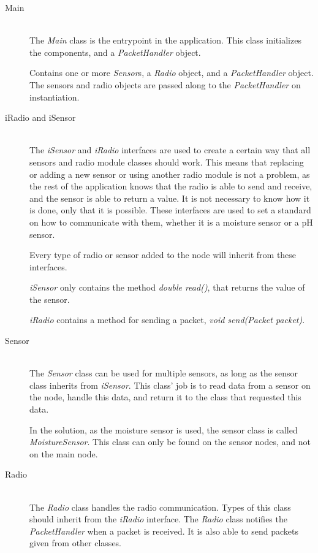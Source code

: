 \begin{description}
\item[Main] \hfill \\
The \textit{Main} class is the entrypoint in the application. This class initializes the components, and a \textit{PacketHandler} object.

Contains one or more \textit{Sensor}s, a \textit{Radio} object, and a \textit{PacketHandler} object. The sensors and radio objects are passed along to the \textit{PacketHandler} on instantiation.

\item[iRadio and iSensor] \hfill \\
The \textit{iSensor} and \textit{iRadio} interfaces are used to create a certain way that all sensors and radio module classes should work. This means that replacing or adding a new sensor or using another radio module is not a problem, as the rest of the application knows that the radio is able to send and receive, and the sensor is able to return a value. 
It is not necessary to know how it is done, only that it is possible. These interfaces are used to set a standard on how to communicate with them, whether it is a moisture sensor or a pH sensor.

Every type of radio or sensor added to the node will inherit from these interfaces.


\textit{iSensor} only contains the method \textit{double read()}, that returns the value of the sensor. 

\textit{iRadio} contains a method for sending a packet, \textit{void send(Packet packet)}. 

\item[Sensor] \hfill \\
The \textit{Sensor} class can be used for multiple sensors, as long as the sensor class inherits from \textit{iSensor}. This class' job is to read data from a sensor on the node, handle this data, and return it to the class that requested this data.

In the solution, as the moisture sensor is used, the sensor class is called \textit{MoistureSensor}. This class can only be found on the sensor nodes, and not on the main node.


\item[Radio] \hfill \\
The \textit{Radio} class handles the radio communication. Types of this class should inherit from the \textit{iRadio} interface. The \textit{Radio} class notifies the \textit{PacketHandler} when a packet is received. It is also able to send packets given from other classes.


\end{description}
